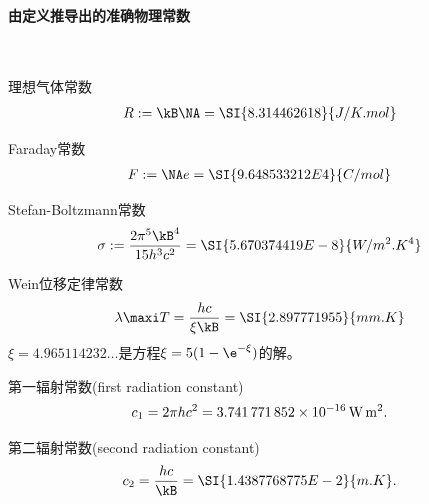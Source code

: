 \paragraph{由定义推导出的准确物理常数}~
\begin{compactitem}
	\item 理想气体常数
		\begin{align}
			R:=\kB\NA=\SI{8.314462618}{J/K.mol}
		\end{align} %
	\item Faraday常数
		\begin{align}
			F:=\NA e=\SI{9.648533212E4}{C/mol}
		\end{align} %
	\item Stefan-Boltzmann常数
		\begin{align}
			\sigma:=\frac{2\pi^5\kB^4}{15h^3c^2}=\SI{5.670374419E-8}{W/m^2.K^4}
		\end{align} %
	\item Wein位移定律常数
		\begin{align}
			\lambda\maxi T=\frac{hc}{\xi\kB}=\SI{2.897771955}{mm.K}
		\end{align} %
		$\xi=\num{4.965114232}\ldots$是方程$\xi=5(1-\e^{-\xi})$的解。
	\item 第一辐射常数(first radiation constant)
		\begin{equation}
			c_1=2\pi hc^2=\SI{3.741771852E-16}{W.m^2}.
		\end{equation} %
	\item 第二辐射常数(second radiation constant)
		\begin{equation}
			c_2=\frac{hc}\kB=\SI{1.4387768775E-2}{m.K}.
		\end{equation} %
\end{compactitem}
